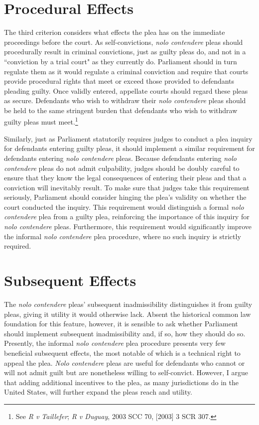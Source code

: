 \section{Procedural Effects}

The third criterion considers what effects the plea has on the immediate proceedings before the court. As self-convictions, \textit{nolo contendere} pleas should procedurally result in criminal convictions, just as guilty pleas do, and not in a ``conviction by a trial court" as they currently do. Parliament should in turn regulate them as it would regulate a criminal conviction and require that courts provide procedural rights that meet or exceed those provided to defendants pleading guilty. Once validly entered, appellate courts should regard these pleas as secure. Defendants who wish to withdraw their \textit{nolo contendere} pleas should be held to the same stringent burden that defendants who wish to withdraw guilty pleas must meet.\footnote{See \textit{R v Taillefer}; \textit{R v Duguay}, 2003 SCC 70, [2003] 3 SCR 307.}

Similarly, just as Parliament statutorily requires judges to conduct a plea inquiry for defendants entering guilty pleas, it should implement a similar requirement for defendants entering \textit{nolo contendere} pleas. Because defendants entering \textit{nolo contendere} pleas do not admit culpability, judges should be doubly careful to ensure that they know the legal consequences of entering their pleas and that a conviction will inevitably result. To make sure that judges take this requirement seriously, Parliament should consider hinging the plea's validity on whether the court conducted the inquiry. This requirement would distinguish a formal \textit{nolo contendere} plea from a guilty plea, reinforcing the importance of this inquiry for \textit{nolo contendere} pleas. Furthermore, this requirement would significantly improve the informal \textit{nolo contendere} plea procedure, where no such inquiry is strictly required.

\section{Subsequent Effects}

The \textit{nolo contendere} pleas' subsequent inadmissibility distinguishes it from guilty pleas, giving it utility it would otherwise lack. Absent the historical common law foundation for this feature, however, it is sensible to ask whether Parliament should implement subsequent inadmissibility and, if so, how they should do so. Presently, the informal \textit{nolo contendere} plea procedure presents very few beneficial subsequent effects, the most notable of which is a technical right to appeal the plea. \textit{Nolo contendere} pleas are useful for defendants who cannot or will not admit guilt but are nonetheless willing to self-convict. However, I argue that adding additional incentives to the plea, as many jurisdictions do in the United States, will further expand the pleas reach and utility. 

